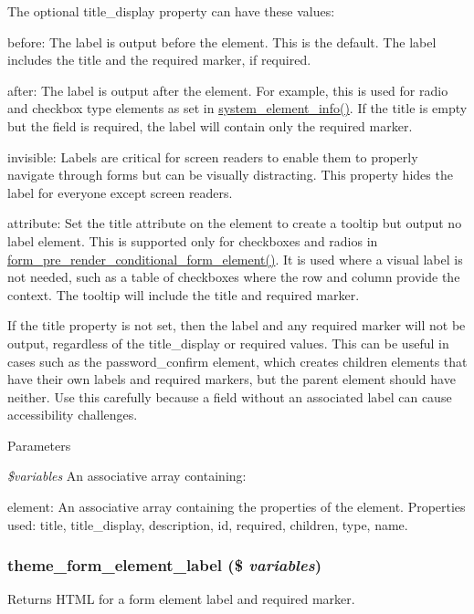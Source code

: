 The optional title\_\-display property can have these values:
\begin{DoxyItemize}
\item before: The label is output before the element. This is the default. The label includes the title and the required marker, if required.
\item after: The label is output after the element. For example, this is used for radio and checkbox type elements as set in \hyperlink{system_8module_a39faa9a5430a70bb37a3c8af72460a14}{system\_\-element\_\-info()}. If the title is empty but the field is required, the label will contain only the required marker.
\item invisible: Labels are critical for screen readers to enable them to properly navigate through forms but can be visually distracting. This property hides the label for everyone except screen readers.
\item attribute: Set the title attribute on the element to create a tooltip but output no label element. This is supported only for checkboxes and radios in \hyperlink{group__form__api_gac0bc3f3520adb84698903c4d0078fe2c}{form\_\-pre\_\-render\_\-conditional\_\-form\_\-element()}. It is used where a visual label is not needed, such as a table of checkboxes where the row and column provide the context. The tooltip will include the title and required marker.
\end{DoxyItemize}

If the title property is not set, then the label and any required marker will not be output, regardless of the title\_\-display or required values. This can be useful in cases such as the password\_\-confirm element, which creates children elements that have their own labels and required markers, but the parent element should have neither. Use this carefully because a field without an associated label can cause accessibility challenges.


\begin{DoxyParams}{Parameters}
\item[{\em \$variables}]An associative array containing:
\begin{DoxyItemize}
\item element: An associative array containing the properties of the element. Properties used: title, title\_\-display, description, id, required, children, type, name. 
\end{DoxyItemize}\end{DoxyParams}
\hypertarget{group__themeable_gaf3ba527e41db52bfb82c3fc42207540d}{
\subsubsection[{theme\_\-form\_\-element\_\-label}]{\setlength{\rightskip}{0pt plus 5cm}theme\_\-form\_\-element\_\-label (\$ {\em variables})}}
\label{group__themeable_gaf3ba527e41db52bfb82c3fc42207540d}
Returns HTML for a form element label and required marker.

